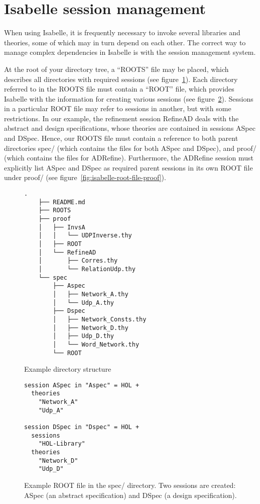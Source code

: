 \documentclass[twoside]{memoir}
\begin{document}
\section{Isabelle session management}
When using Isabelle, it is frequently necessary to invoke several libraries and theories,
some of which may in turn depend on each other.
The correct way to manage complex dependencies in Isabelle is with the session management system.

At the root of your directory tree, a ``ROOTS'' file may be placed, which describes all directories with required sessions (see figure~\ref{fig:isabelle-roots-file}).
Each directory referred to in the ROOTS file must contain a ``ROOT'' file, which provides Isabelle with the information for creating various sessions
(see figure~\ref{fig:isabelle-root-file-spec}).
Sessions in a particular ROOT file may refer to sessions in another, but with some restrictions.
In our example, the refinement session RefineAD deals with the abstract and design specifications, whose theories are contained in sessions
ASpec and DSpec.
Hence, our ROOTS file must contain a reference to both parent directories spec/ (which contains the files for both ASpec and DSpec), and proof/
(which contains the files for ADRefine).
Furthermore, the ADRefine session must explicitly list ASpec and DSpec as required parent sessions in its own ROOT file under proof/ (see figure~\ref{fig:isabelle-root-file-proof}).

\begin{figure}[htpb]
    \centering
    \begin{lstlisting}[style=tree, language=file]
    .
    ├── README.md
    ├── ROOTS
    ├── proof
    │   ├── InvsA
    │   │   └── UDPInverse.thy
    │   ├── ROOT
    │   └── RefineAD
    │       ├── Corres.thy
    │       └── RelationUdp.thy
    └── spec
        ├── Aspec
        │   ├── Network_A.thy
        │   └── Udp_A.thy
        ├── Dspec
        │   ├── Network_Consts.thy
        │   ├── Network_D.thy
        │   ├── Udp_D.thy
        │   └── Word_Network.thy
        └── ROOT
    \end{lstlisting}
    
    \caption{Example directory structure}
    \label{fig:isabelle-roots-file}
\end{figure}

\begin{figure}[htpb]
    \centering
    \begin{lstlisting}[language=isabelle]
session ASpec in "Aspec" = HOL +
  theories
    "Network_A"
    "Udp_A"

session DSpec in "Dspec" = HOL +
  sessions
    "HOL-Library"
  theories
    "Network_D"
    "Udp_D"
    \end{lstlisting}
    
    \caption{Example ROOT file in the spec/ directory. Two sessions are created: ASpec (an abstract specification) and DSpec (a design specification).}
    \label{fig:isabelle-root-file-spec}
\end{figure}
\end{document}
